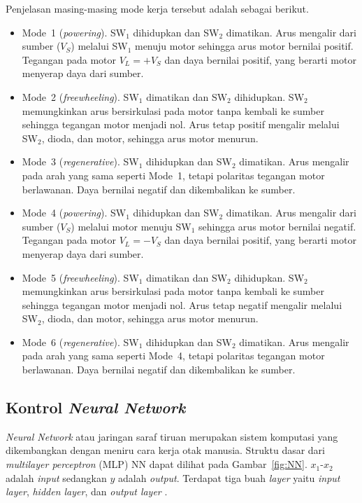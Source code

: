 Penjelasan masing-masing mode kerja tersebut adalah sebagai berikut.
\begin{itemize}[nolistsep]
  \item Mode~1 (\emph{powering}). SW$_1$ dihidupkan dan SW$_2$
        dimatikan. Arus mengalir dari sumber ($V_S$) melalui SW$_1$ menuju motor
        sehingga arus motor bernilai positif. Tegangan pada motor $V_L = +V_S$
        dan daya bernilai positif, yang berarti motor menyerap daya dari sumber.
  \item Mode~2 (\emph{freewheeling}). SW$_1$ dimatikan dan SW$_2$
        dihidupkan. SW$_2$ memungkinkan arus bersirkulasi pada motor tanpa kembali
        ke sumber sehingga tegangan motor menjadi nol. Arus tetap positif mengalir
        melalui SW$_2$, dioda, dan motor, sehingga arus motor menurun.
  \item Mode~3 (\emph{regenerative}). SW$_1$ dihidupkan dan SW$_2$
        dimatikan. Arus mengalir pada arah yang sama seperti Mode~1, tetapi
        polaritas tegangan motor berlawanan. Daya bernilai negatif dan
        dikembalikan ke sumber.
  \item Mode~4 (\emph{powering}). SW$_1$ dihidupkan dan SW$_2$
        dimatikan. Arus mengalir dari sumber ($V_S$) melalui motor menuju SW$_1$
        sehingga arus motor bernilai negatif. Tegangan pada motor $V_L = -V_S$ dan
        daya bernilai positif, yang berarti motor menyerap daya dari sumber.
  \item Mode~5 (\emph{freewheeling}). SW$_1$ dimatikan dan SW$_2$
        dihidupkan. SW$_2$ memungkinkan arus bersirkulasi pada motor tanpa kembali
        ke sumber sehingga tegangan motor menjadi nol. Arus tetap negatif mengalir
        melalui SW$_2$, dioda, dan motor, sehingga arus motor menurun.
  \item Mode~6 (\emph{regenerative}). SW$_1$ dihidupkan dan SW$_2$
        dimatikan. Arus mengalir pada arah yang sama seperti Mode~4, tetapi
        polaritas tegangan motor berlawanan. Daya bernilai negatif dan
        dikembalikan ke sumber.
\end{itemize}

\subsection{Kontrol \emph{Neural Network}}
\emph{Neural Network} atau jaringan saraf tiruan merupakan sistem komputasi yang
dikembangkan dengan meniru cara kerja otak manusia. Struktu dasar dari \emph{multilayer
perceptron} (MLP) NN dapat dilihat pada Gambar~\ref{fig:NN}. $x_{\text{1}}$-$x_{\text{2}}$
adalah \emph{input} sedangkan $y$ adalah \emph{output}. Terdapat tiga buah \emph{layer}
yaitu \emph{input layer}, \emph{hidden layer}, dan \emph{output layer} \parencite{ann}.


